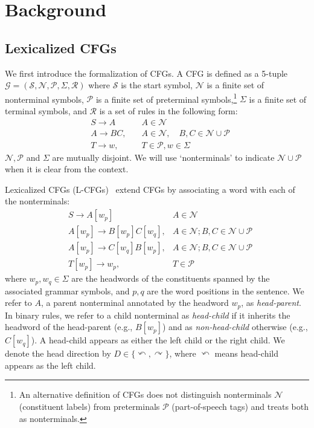 \documentclass[11pt,a4paper]{article}
\begin{document}
\section{Background}
\subsection{Lexicalized CFGs}
We first introduce the formalization of CFGs.
A CFG is defined as a 5-tuple $\mathcal{G} = (\mathcal{S},\mathcal{N}, \mathcal{P},\Sigma, \mathcal{R})$ where $\mathcal{S}$ is the start symbol, $\mathcal{N}$ is a finite set of nonterminal symbols, $\mathcal{P}$ is a finite set of preterminal symbols,\footnote{An alternative definition of CFGs does not distinguish nonterminals $\mathcal{N}$ (constituent labels) from preterminals $\mathcal{P}$ (part-of-speech tags) and treats both as nonterminals.} 
$\Sigma$ is a finite set of terminal symbols, and $\mathcal{R}$ is a set of rules in the following form:
\begin{align*}
	&S \rightarrow A   & \quad A \in \mathcal{N} \\
	&A \rightarrow B C, &\quad A \in \mathcal{N}, \quad B, C \in \mathcal{N} \cup \mathcal{P} \\ &T\rightarrow w, & \quad T \in \mathcal{P}, w \in \Sigma  
\end{align*}
$\mathcal{N}, \mathcal{P}$ and $\Sigma$ are mutually disjoint.
We will use `nonterminals' to indicate $\mathcal{N}\cup\mathcal{P}$ when it is clear from the context.

Lexicalized CFGs (L-CFGs)~\citep{collins-2003-head} extend CFGs by associating a word with each of the nonterminals:
\begin{align*}
	&S \rightarrow A[w_p]   &  A \in \mathcal{N} \\
	&A[w_p] \rightarrow B[w_p] C[w_q], & A \in \mathcal{N};  B, C \in \mathcal{N} \cup \mathcal{P} \\
	&A[w_p] \rightarrow C[w_q] B[w_p], & A \in \mathcal{N};  B, C \in \mathcal{N} \cup \mathcal{P}\\
	&T[w_p] \rightarrow w_p, & T \in \mathcal{P}
\end{align*}
where $w_p,w_q \in\Sigma$ are the headwords of the constituents spanned by the associated grammar symbols, and $p, q$ are the word positions in the sentence.
We refer to $A$, a parent nonterminal annotated by the headword $w_p$, as \emph{head-parent}.
In binary rules, we refer to a child nonterminal as \emph{head-child} if it inherits the headword of the head-parent (e.g., $B[w_p]$) and as \emph{non-head-child} otherwise  (e.g., $C[w_q]$).
A head-child appears as either the left child or the right child.
We denote the head direction by $D\in\{\curvearrowleft, \curvearrowright\}$, where $\curvearrowleft$ means head-child appears as the left child.
\end{document}
